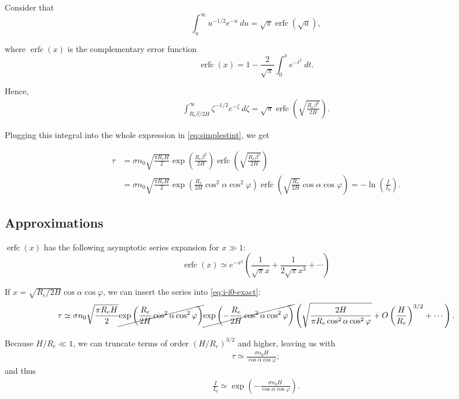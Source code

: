 \documentclass[10pt]{article}
\DeclareMathOperator{\erfc}{erfc}
\begin{document}
Consider that
$$
\int_a^{\infty} u^{-1/2} e^{-u} \: du = \sqrt{\pi} \erfc\left(\sqrt{a}\right),
$$

where $\erfc(x)$ is the complementary error function
$$
\erfc(x) =  1- \frac{2}{\sqrt{\pi}} \int_0^x e^{-t^2} \: dt.
$$

Hence,
\begin{align}
\int_{R_e \beta/2H}^{\infty} \zeta^{-1/2} e^{-\zeta} \: d\zeta = \sqrt{\pi} \erfc\left({\sqrt{\frac{R_e \beta^2}{2H}}}\right).
\end{align}

Plugging this integral into the whole expression in \eqref{eq:simplestint}, we get

\begin{equation}
\boxed{
\begin{aligned} 
 \tau &= \sigma n_0 \sqrt{\frac{\pi R_e H}{2}} \exp\left(\frac{R_e \beta^2}{2H}\right) \erfc\left({\sqrt{\frac{R_e \beta^2}{2H}}}\right)  \\[0.4em]
&= \sigma n_0 \sqrt{\frac{\pi R_e H}{2}} \exp\left(\frac{R_e}{2H} \cos^2\alpha \cos^2\varphi \right) \erfc\left({\sqrt{\frac{R_e}{2H}}\cos\alpha \cos\varphi}\right) = -\ln \left(\frac{I}{I_0}\right). \label{eq:i-i0-exact}
\end{aligned} }
\end{equation}

\subsection{Approximations}
$\erfc(x)$ has the following asymptotic series expansion for $x \gg 1$:
$$
\erfc(x) \simeq e^{-x^2}\left(\frac{1}{\sqrt{\pi} x} + \frac{1}{2\sqrt{\pi} x^3} + \cdots \right)
$$

If $x = \sqrt{R_e / 2H}\cos\alpha \cos\varphi$, we can insert the series into \eqref{eq:i-i0-exact}:
$$
\tau \simeq \sigma n_0 \sqrt{\frac{\pi R_e H}{2}} \cancel{\exp\left(\frac{R_e}{2H} \cos^2\alpha \cos^2\varphi \right)} \cancel{\exp\left(-\frac{R_e}{2H} \cos^2\alpha \cos^2\varphi \right)} \left(\sqrt{\frac{2H}{\pi R_e\cos^2\alpha \cos^2\varphi}} + O\left(\frac{H}{R_e}\right)^{3/2} + \cdots \right).
$$

Because $H/R_e \ll 1$, we can truncate terms of order $(H/R_e)^{3/2}$ and higher, leaving us with
\begin{align}
\tau \simeq \frac{\sigma n_0 H}{\cos\alpha \cos\varphi};
\end{align}
and thus
\begin{align} \label{eq:i-i0-approx}
\boxed{ \frac{I}{I_0} \simeq \exp\left(-\frac{\sigma n_0 H}{\cos\alpha \cos\varphi}\right). }
\end{align}
\end{document}
